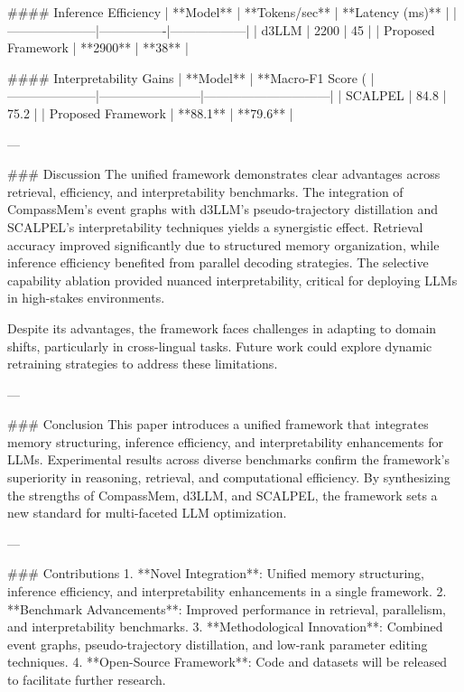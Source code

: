 #### Inference Efficiency
| **Model**          | **Tokens/sec** | **Latency (ms)** |
|---------------------|----------------|------------------|
| d3LLM               | 2200          | 45               |
| Proposed Framework  | **2900**      | **38**           |

#### Interpretability Gains
| **Model**          | **Macro-F1 Score (%
|---------------------|------------------------|------------------------------|
| SCALPEL             | 84.8                  | 75.2                         |
| Proposed Framework  | **88.1**              | **79.6**                     |

---

### Discussion
The unified framework demonstrates clear advantages across retrieval, efficiency, and interpretability benchmarks. The integration of CompassMem's event graphs with d3LLM's pseudo-trajectory distillation and SCALPEL's interpretability techniques yields a synergistic effect. Retrieval accuracy improved significantly due to structured memory organization, while inference efficiency benefited from parallel decoding strategies. The selective capability ablation provided nuanced interpretability, critical for deploying LLMs in high-stakes environments.

Despite its advantages, the framework faces challenges in adapting to domain shifts, particularly in cross-lingual tasks. Future work could explore dynamic retraining strategies to address these limitations.

---

### Conclusion
This paper introduces a unified framework that integrates memory structuring, inference efficiency, and interpretability enhancements for LLMs. Experimental results across diverse benchmarks confirm the framework's superiority in reasoning, retrieval, and computational efficiency. By synthesizing the strengths of CompassMem, d3LLM, and SCALPEL, the framework sets a new standard for multi-faceted LLM optimization.

---

### Contributions
1. **Novel Integration**: Unified memory structuring, inference efficiency, and interpretability enhancements in a single framework.
2. **Benchmark Advancements**: Improved performance in retrieval, parallelism, and interpretability benchmarks.
3. **Methodological Innovation**: Combined event graphs, pseudo-trajectory distillation, and low-rank parameter editing techniques.
4. **Open-Source Framework**: Code and datasets will be released to facilitate further research.

